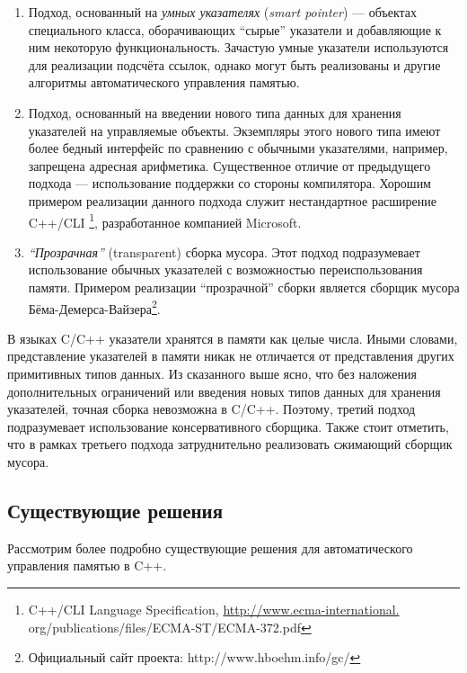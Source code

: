 \begin{enumerate}
\item 
	Подход, основанный на \emph{умных указателях} (\emph{smart pointer}) --- 
	объектах специального класса, оборачивающих ``сырые'' указатели и добавляющие 
	к ним некоторую функциональность. 
	Зачастую умные указатели используются для реализации подсчёта ссылок, однако могут 
	быть реализованы и другие алгоритмы автоматического управления памятью.
\item 
	Подход, основанный на введении нового типа данных для хранения указателей на 
	управляемые объекты. 
	Экземпляры этого нового типа имеют более бедный интерфейс по сравнению с обычными 
	указателями, например, запрещена адресная арифметика. Существенное отличие от 
	предыдущего подхода --- использование поддержки со стороны компилятора. 
	Хорошим примером реализации данного подхода служит нестандартное расширение 
	C++/CLI
	\footnote{C++/CLI Language Specification,
	\url{http://www.ecma-international.}\\{org/publications/files/ECMA-ST/ECMA-372.pdf}}, разработанное компанией Microsoft.
\item 
	\emph{``Прозрачная''} (transparent) сборка мусора. Этот подход подразумевает 
	использование обычных указателей с возможностью переиспользования памяти. 
	Примером реализации ``прозрачной'' сборки является сборщик мусора 
	Бёма-Демерса-Вайзера\footnote{Официальный сайт проекта: http://www.hboehm.info/gc/}.
\end{enumerate}

В языках C/C++ указатели хранятся в памяти как целые числа. 
Иными словами, представление указателей в памяти никак не отличается от представления 
других примитивных типов данных. 
Из сказанного выше ясно, что без наложения дополнительных ограничений или введения новых 
типов данных для хранения указателей, точная сборка невозможна в C/C++. 
Поэтому, третий подход подразумевает использование консервативного сборщика. 
Также стоит отметить, что в рамках третьего подхода затруднительно реализовать 
сжимающий сборщик мусора.


\subsection{Существующие решения}
\label{sec:cpp_solutions}

Рассмотрим более подробно существующие решения для автоматического управления памятью в C++. 

